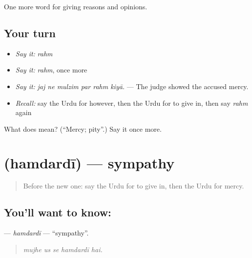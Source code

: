\begin{grammarlens}[title={What you've built}]
One more word for giving reasons and opinions.
\end{grammarlens}

\subsection*{Your turn}
\begin{itemize}
\raggedright
  \item \emph{Say it:} \emph{rahm}
  \item \emph{Say it:} \emph{rahm}, once more
  \item \emph{Say it:} \emph{jaj ne mulzim par rahm kiyā.} — The judge showed the accused mercy.
  \item \emph{Recall:} say the Urdu for however, then the Urdu for to give in, then say \emph{rahm} again
\end{itemize}

\begin{tcolorbox}[breakable,colback=teal!4,colframe=teal!35!black,title={Before you move on}]
What does  mean? (\textquotedblleft{}Mercy; pity\textquotedblright{}.) Say it once more.
\end{tcolorbox}
\section[\texorpdfstring{\ur{ہمدردی} (hamdardī)}{ہمدردی (hamdardī)}]{ (hamdardī) — sympathy}

\label{lesson:UR-C360-hamdardi}



\begin{quote}
Before the new one: say the Urdu for to give in, then the Urdu for mercy.
\end{quote}

\subsection*{You'll want to know: }
\textbf{} — \emph{hamdardī} — \textquotedblleft{}sympathy\textquotedblright{}.

\begin{quote}
    
\end{quote}

\begin{quote}
\emph{mujhe us se hamdardī hai.}
\end{quote}

